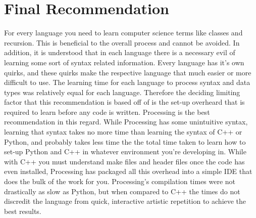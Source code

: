 \section{Final Recommendation}
For every language you need to learn computer science terms like classes and recursion.  This is beneficial to the overall process and cannot be avoided.  In addition, it is understood that in each language there is a necessary evil of learning some sort of syntax related information.  Every language has it's own quirks, and these quirks make the respective language that much easier or more difficult to use.  The learning time for each language to process syntax and data types was relatively equal for each language.  Therefore the deciding limiting factor that this recommendation is based off of is the set-up overheard that is required to learn before any code is written.  Processing is the best recommendation in this regard.  While Processing has some unintuitive syntax, learning that syntax takes no more time than learning the syntax of C++ or Python, and probably takes less time the the total time taken to learn how to set-up Python and C++ in whatever environment you're developing in.  While with C++ you must understand make files and header files once the code has even installed, Processing has packaged all this overhead into a simple IDE that does the bulk of the work for you.  Processing's compilation times were not drastically  as slow as Python, but when compared to C++ the times do not discredit the language from quick, interactive artistic repetition to achieve the best results.  